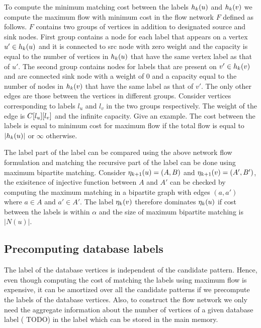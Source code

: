  To compute the minimum
matching cost between the \khop labels
$h_{k}(u)$ and $h_{k}(v)$ we compute the maximum flow with minimum
cost in the flow network $F$ defined as follows. $F$ contains two groups of
vertices in addition to designated source and sink nodes. 
First group contains a node for
each label that appears on a vertex $u' \in h_{k}(u)$ and it is connected
to src node with zero weight and the capacity is equal to the number of vertices
in $h_{k}(u)$ that have the same vertex label as that of $u'$.
The second group contains nodes
for labels that are present on $v' \in h_{k}(v)$ and are connected sink 
node with a weight of $0$ and a capacity equal to the 
number of nodes in $h_{k}(v)$ that have the same label as
that of $v'$. The only other edges are those between the
vertices in different groups. Consider vertices corresponding to labels $l_u$
and $l_v$ in the two groups respectively. The weight of the edge is ${C}[l_u][l_v]$
and the infinite capacity.
Give an example. The cost between the \khop labels is equal to
minimum cost for maximum flow if the total flow is equal to $|h_{k}(u)|$ or 
$\infty$ otherwise.

 The \khop label part of the \ncl label can
be compared using the above network flow formulation and matching the recursive
part of the \ncl label can be done using maximum bipartite matching. Consider 
$\eta_{k+1}(u) = (A, B)$ and $\eta_{k+1}(v) = (A', B')$, the 
exisitence of injective function between $A$ and $A'$ can be checked by computing 
the maximum matching in a bipartite graph with edges $(a, a')$ where $a \in A$ and
$a' \in A'$.
The \ncl label
$\eta_{k}(v)$ therefore dominates $\eta_{k}(u)$ if cost between the \khop labels is within
$\alpha$ and the size of maximum bipartite matching is $|N(u)|$.

\subsection{Precomputing database \khop labels}
The \khop label of the database vertices is independent of the candidate pattern. Hence, even though
computing the cost of matching the \khop labels using maximum flow is expensive, it
can be amortized over all the candidate patterns  if we precompute the \khop labels of the
database vertices. Also, to construct the flow network we only need the aggregate information
about the number of vertices of a given database label ( TODO) 
in the \khop label which can be stored in the main memory. 

